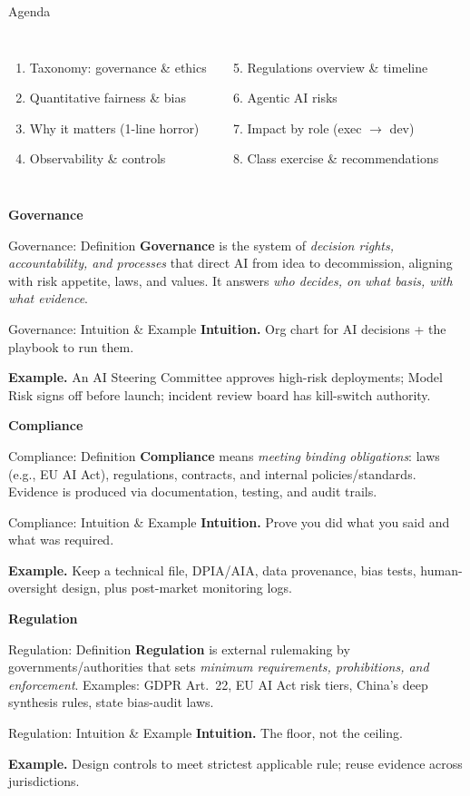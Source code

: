 \documentclass[11pt,aspectratio=169]{beamer}
\newcommand{\Term}[1]{%
  \begin{frame}
    \centering\vfill
    {\usebeamerfont{title}\usebeamercolor[fg]{title}\Huge\textbf{#1}}
    \vfill
  \end{frame}
}
\newcommand{\Definition}[2]{%
  \begin{frame}{#1: \;Definition}
    \justifying
    #2
  \end{frame}
}
\newcommand{\Intuition}[3]{%
  \begin{frame}{#1: \;Intuition \& Example}
    \justifying
    \textbf{Intuition.} #2
    \medskip

    \textbf{Example.} #3
  \end{frame}
}
\begin{document}
\begin{frame}{Agenda}
\begin{columns}[T,onlytextwidth]
\begin{enumerate}
  \item Taxonomy: governance \& ethics
  \item Quantitative fairness \& bias
  \item Why it matters (1-line horror)
  \item Observability \& controls
\end{enumerate}
\begin{enumerate}
  \setcounter{enumi}{4}
  \item Regulations overview \& timeline
  \item Agentic AI risks
  \item Impact by role (exec $\rightarrow$ dev)
  \item Class exercise \& recommendations
\end{enumerate}
\end{columns}
\end{frame}

\Term{Governance}
\Definition{Governance}{\justifying
\textbf{Governance} is the system of \emph{decision rights, accountability, and processes} that direct AI from idea to decommission, aligning with risk appetite, laws, and values. It answers \emph{who decides, on what basis, with what evidence}.}
\Intuition{Governance}{Org chart for AI decisions + the playbook to run them.}{An AI Steering Committee approves high-risk deployments; Model Risk signs off before launch; incident review board has kill-switch authority.}

\Term{Compliance}
\Definition{Compliance}{\justifying
\textbf{Compliance} means \emph{meeting binding obligations}: laws (e.g., EU AI Act), regulations, contracts, and internal policies/standards. Evidence is produced via documentation, testing, and audit trails.}
\Intuition{Compliance}{Prove you did what you said and what was required.}{Keep a technical file, DPIA/AIA, data provenance, bias tests, human-oversight design, plus post-market monitoring logs.}

\Term{Regulation}
\Definition{Regulation}{\justifying
\textbf{Regulation} is external rulemaking by governments/authorities that sets \emph{minimum requirements, prohibitions, and enforcement}. Examples: GDPR Art.\ 22, EU AI Act risk tiers, China’s deep synthesis rules, state bias-audit laws.}
\Intuition{Regulation}{The floor, not the ceiling.}{Design controls to meet strictest applicable rule; reuse evidence across jurisdictions.}
\end{document}
